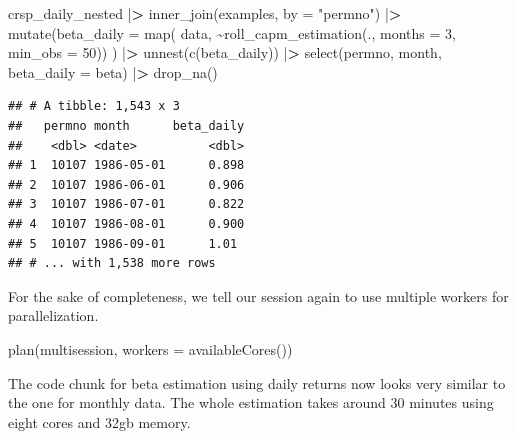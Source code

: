 \documentclass[
]{book}
\newenvironment{Shaded}{\begin{snugshade}}{\end{snugshade}}
\newcommand{\AttributeTok}[1]{\textcolor[rgb]{0.61,0.61,0.61}{#1}}
\newcommand{\DecValTok}[1]{\textcolor[rgb]{0.06,0.06,0.06}{#1}}
\newcommand{\ErrorTok}[1]{\textcolor[rgb]{0.14,0.14,0.14}{\textbf{#1}}}
\newcommand{\FunctionTok}[1]{\textcolor[rgb]{0,0,0}{#1}}
\newcommand{\NormalTok}[1]{#1}
\newcommand{\SpecialCharTok}[1]{\textcolor[rgb]{0,0,0}{#1}}
\newcommand{\StringTok}[1]{\textcolor[rgb]{0.5,0.5,0.5}{#1}}
\begin{document}
\begin{Shaded}
\begin{Highlighting}[]
\NormalTok{crsp\_daily\_nested }\SpecialCharTok{|}\ErrorTok{\textgreater{}}
  \FunctionTok{inner\_join}\NormalTok{(examples, }\AttributeTok{by =} \StringTok{"permno"}\NormalTok{) }\SpecialCharTok{|}\ErrorTok{\textgreater{}}
  \FunctionTok{mutate}\NormalTok{(}\AttributeTok{beta\_daily =} \FunctionTok{map}\NormalTok{(}
\NormalTok{    data, }
    \SpecialCharTok{\textasciitilde{}}\FunctionTok{roll\_capm\_estimation}\NormalTok{(., }\AttributeTok{months =} \DecValTok{3}\NormalTok{, }\AttributeTok{min\_obs =} \DecValTok{50}\NormalTok{))}
\NormalTok{    ) }\SpecialCharTok{|}\ErrorTok{\textgreater{}}
  \FunctionTok{unnest}\NormalTok{(}\FunctionTok{c}\NormalTok{(beta\_daily)) }\SpecialCharTok{|}\ErrorTok{\textgreater{}}
  \FunctionTok{select}\NormalTok{(permno, month, }\AttributeTok{beta\_daily =}\NormalTok{ beta) }\SpecialCharTok{|}\ErrorTok{\textgreater{}}
  \FunctionTok{drop\_na}\NormalTok{()}
\end{Highlighting}
\end{Shaded}

\begin{verbatim}
## # A tibble: 1,543 x 3
##   permno month      beta_daily
##    <dbl> <date>          <dbl>
## 1  10107 1986-05-01      0.898
## 2  10107 1986-06-01      0.906
## 3  10107 1986-07-01      0.822
## 4  10107 1986-08-01      0.900
## 5  10107 1986-09-01      1.01 
## # ... with 1,538 more rows
\end{verbatim}

For the sake of completeness, we tell our session again to use multiple workers for parallelization.

\begin{Shaded}
\begin{Highlighting}[]
\FunctionTok{plan}\NormalTok{(multisession, }\AttributeTok{workers =} \FunctionTok{availableCores}\NormalTok{())}
\end{Highlighting}
\end{Shaded}

The code chunk for beta estimation using daily returns now looks very similar to the one for monthly data. The whole estimation takes around 30 minutes using eight cores and 32gb memory.
\end{document}
